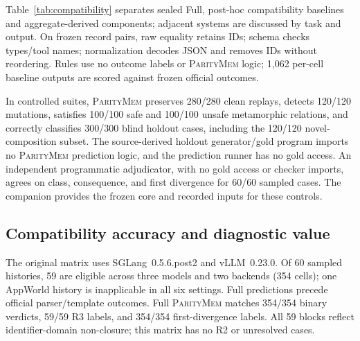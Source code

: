 \documentclass[letterpaper]{article}
\newcommand{\system}{\textsc{ParityMem}\xspace}
\begin{document}
Table~\ref{tab:compatibility} separates sealed Full, post-hoc compatibility
baselines and aggregate-derived components; adjacent systems are discussed by
task and output. On frozen record pairs, raw equality retains IDs; schema checks
types/tool names; normalization decodes JSON and removes IDs without reordering.
Rules use no outcome labels or \system logic; 1,062 per-cell baseline outputs
are scored against frozen official outcomes.

In controlled suites, \system preserves 280/280 clean replays, detects
120/120 mutations, satisfies 100/100 safe and 100/100 unsafe metamorphic
relations, and correctly classifies 300/300 blind holdout cases, including the
120/120 novel-composition subset. The source-derived holdout generator/gold
program imports no \system prediction logic, and the prediction runner has
no gold access. An independent programmatic adjudicator, with no gold access or checker imports,
agrees on class, consequence, and first divergence for 60/60 sampled cases. The companion provides the frozen core and recorded inputs for these controls.

\subsection{Compatibility accuracy and diagnostic value}
The original matrix uses SGLang~0.5.6.post2 and vLLM~0.23.0. Of 60 sampled
histories, 59 are eligible across three models and two backends (354 cells);
one AppWorld history is inapplicable in all six settings. Full predictions
precede official parser/template outcomes. Full \system matches 354/354 binary
verdicts, 59/59 R3 labels, and 354/354 first-divergence labels. All 59 blocks
reflect identifier-domain non-closure; this matrix has no R2 or unresolved cases.
\end{document}
